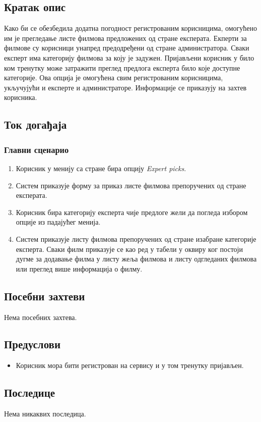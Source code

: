 \subsection{Кратак опис}

Како би се обезбедила додатна погодност регистрованим корисницима, омогућено им је прегледање листе филмова предложених од стране експерата. Екперти за филмове су корисници унапред предодређени од стране администратора. Сваки експерт
има категорију филмова за коју је задужен. Пријављени корисник у било ком тренутку може затражити преглед предлога експерта било које доступне категорије. Ова опција је омогућена свим регистрованим корисницима, укључујући и експерте и администраторе. Информације се приказују на захтев корисника.

\subsection{Ток догађаја}

\subsubsection{Главни сценарио}

\begin{enumerate}
    \item Корисник у менију са стране бира опцију \textit{Expert picks}.
    \item Систем приказује форму за приказ листе филмова препоручених од стране експерата.
    \item Корисник бира категорију експерта чије предлоге жели да погледа избором опције из падајућег менија.
    \item Систем приказује листу филмова препоручених од стране изабране категорије експерта. Сваки филм приказује 
    се као ред у табели у оквиру ког постоји дугме за додавање филма у листу жеља филмова и листу одгледаних филмова 
    или преглед више информација о филму.
\end{enumerate}

\subsection{Посебни захтеви}

Нема посебних захтева.

\subsection{Предуслови}

\begin{itemize}
    \item Корисник мора бити регистрован на сервису и у том тренутку пријављен.
\end{itemize}

\subsection{Последице}

Нема никаквих последица.

